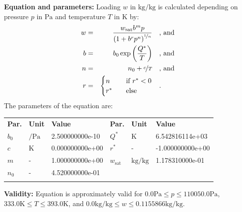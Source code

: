 \textbf{Equation and parameters:}
\newline
%
Loading $w$ in $\si{\kilogram\per\kilogram}$ is calculated depending on pressure $p$ in $\si{\pascal}$ and temperature $T$ in $\si{\kelvin}$ by:
%
\begin{equation*}
\begin{split}
w &=& \frac{w_\mathrm{sat} b^{m} p}{\left( 1 + b^{r} p^{n} \right)^{\nicefrac{1}{n}}} & \quad\text{, and} \\
b &=& b_0 \exp\left( \frac{Q^{*}}{T} \right) & \quad\text{, and} \\
n &=& n_0 + \nicefrac{c}{T} & \quad\text{, and} \\
r &=& \begin{cases} n & \quad \text{if } r^{*} < 0 \\ r^{*}  & \quad \text{else} \end{cases} & \quad\text{.}
\end{split}
\end{equation*}
%
The parameters of the equation are:
%
\begin{longtable}[l]{lll|lll}
\toprule
\addlinespace
\textbf{Par.} & \textbf{Unit} & \textbf{Value} &	\textbf{Par.} & \textbf{Unit} & \textbf{Value} \\
\addlinespace
\midrule
\endhead

\bottomrule
\endfoot
\bottomrule
\endlastfoot
\addlinespace

$b_0$ & $\si{\per\pascal}$ & 2.500000000e-10 & $Q^{*}$ & $\si{\kelvin}$ & 6.542816114e+03 \\
$c$ & $\si{\kelvin}$ & 0.000000000e+00 & $r^{*}$ & - & -1.000000000e+00 \\
$m$ & - & 1.000000000e+00 & $w_\mathrm{sat}$ & $\si{\kilogram\per\kilogram}$ & 1.178310000e-01 \\
$n_0$ & - & 4.520000000e-01 & & & \\

\addlinespace\end{longtable}

\textbf{Validity:}
\newline
Equation is approximately valid for $0.0 \si{\pascal} \leq p \leq 110050.0 \si{\pascal}$,  $333.0 \si{\kelvin} \leq T \leq 393.0 \si{\kelvin}$, and $0.0 \si{\kilogram\per\kilogram} \leq w \leq 0.1155866 \si{\kilogram\per\kilogram}$.
\newline

